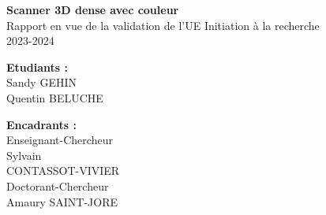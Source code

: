 
\begin{center} %
    \vspace*{\fill} %
    \Huge{\textbf{Scanner 3D dense avec couleur}}\\[1cm]
    \Large{Rapport en vue de la validation de l'UE Initiation à la recherche}\\[0.5cm]
    \Large{2023-2024}\\[0.5cm]
    \vspace*{\fill} %
\end{center}

\begin{minipage}[t]{0.75\textwidth}
    \normalsize\textbf{{Etudiants :}}\\
    \normalsize{Sandy GEHIN \\Quentin BELUCHE}
\end{minipage}
\begin{minipage}[t]{0.5\textwidth}
    \normalsize\textbf{{Encadrants :}}\\
    \normalsize{Enseignant-Chercheur\\ Sylvain\\ CONTASSOT-VIVIER \\Doctorant-Chercheur \\Amaury SAINT-JORE}
\end{minipage}

\clearpage